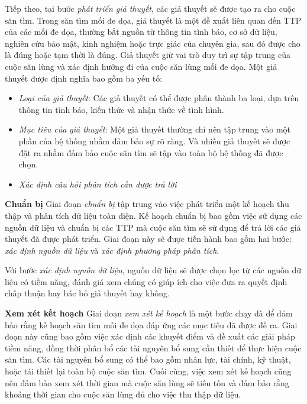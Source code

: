 \bigbreak\noindent
Tiếp theo, tại bước \textit{phát triển giả thuyết}, các giả thuyết sẽ được tạo ra cho cuộc săn tìm. Trong săn tìm mối đe dọa, giả thuyết là một đề xuất liên quan đến TTP của các mối đe dọa, thường bắt nguồn từ thông tin tình báo, cơ sở dữ liệu, nghiên cứu bảo mật, kinh nghiệm hoặc trực giác của chuyên gia, sau đó được cho là đúng hoặc tạm thời là đúng. Giả thuyết giữ vai trò duy trì sự tập trung của cuộc săn lùng và xác định hướng đi của cuộc săn lùng mối đe dọa. Một giả thuyết được định nghĩa bao gồm ba yếu tố:

\begin{itemize}
    \item \textit{Loại của giả thuyết}: Các giả thuyết có thể được phân thành ba loại, dựa trên thông tin tình báo, kiến thức và nhận thức về tình hình.
    \item \textit{Mục tiêu của giả thuyết}: Một giả thuyết thường chỉ nên tập trung vào một phần của hệ thống nhằm đảm bảo sự rõ ràng. Và nhiều giả thuyết sẽ được đặt ra nhằm đảm bảo cuộc săn tìm sẽ tập vào toàn bộ hệ thống đã được chọn.
    \item \textit{Xác định câu hỏi phân tích cần được trả lời}
\end{itemize}

\bigbreak\noindent
\textbf{Chuẩn bị}
\bigbreak\noindent
Giai đoạn \textit{chuẩn bị} tập trung vào việc phát triển một kế hoạch thu thập và phân tích dữ liệu toàn diện. Kế hoạch chuẩn bị bao gồm việc sử dụng các nguồn dữ liệu và chuẩn bị các TTP mà cuộc săn tìm sẽ sử dụng để trả lời các giả thuyết đã được phát triển. Giai đoạn này sẽ được tiến hành bao gồm hai bước: \textit{xác định nguồn dữ liệu} và \textit{xác định phương pháp phân tích}.

\bigbreak\noindent
Với bước \textit{xác định nguồn dữ liệu}, nguồn dữ liệu sẽ được chọn lọc từ các nguồn dữ liệu có tiềm năng, đánh giá xem chúng có giúp ích cho việc đưa ra quyết định chấp thuận hay bác bỏ giả thuyết hay không.

\bigbreak\noindent
\textbf{Xem xét kết hoạch}
\bigbreak\noindent
Giai đoạn \textit{xem xét kế hoạch} là một bước chạy đà để đảm bảo rằng kế hoạch săn tìm mối đe dọa đáp ứng các mục tiêu đã được đề ra. Giai đoạn này cũng bao gồm việc xác định các khuyết điểm và đề xuất các giải pháp tiềm năng, đồng thời phân bổ các tài nguyên bổ sung cần thiết để thực hiện cuộc săn tìm. Các tài nguyên bổ sung có thể bao gồm nhân lực, tài chính, kỹ thuật, hoặc tái thiết lại toàn bộ cuộc săn tìm. Cuối cùng, việc xem xét kế hoạch cũng nên đảm bảo xem xét thời gian mà cuộc săn lùng sẽ tiêu tốn và đảm bảo rằng khoảng thời gian cho cuộc săn lùng đủ cho việc thu thập dữ liệu.

